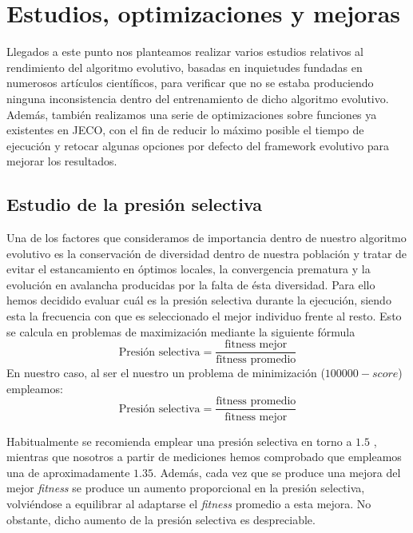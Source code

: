 \chapter{Estudios, optimizaciones y mejoras} \label{cap:analisis}
Llegados a este punto nos planteamos realizar varios estudios relativos al rendimiento del algoritmo evolutivo, basadas en inquietudes fundadas en numerosos artículos científicos, para verificar que no se estaba produciendo ninguna inconsistencia dentro del entrenamiento de dicho algoritmo evolutivo. Además, también realizamos una serie de optimizaciones sobre funciones ya existentes en JECO, con el fin de reducir lo máximo posible el tiempo de ejecución y retocar algunas opciones por defecto del framework evolutivo para mejorar los resultados.

\section{Estudio de la presión selectiva}
Una de los factores que consideramos de importancia dentro de nuestro algoritmo evolutivo es la conservación de diversidad dentro de nuestra población y tratar de evitar el estancamiento en óptimos locales, la convergencia prematura y la evolución en avalancha producidas por la falta de ésta diversidad. Para ello hemos decidido evaluar cuál es la presión selectiva durante la ejecución, siendo esta la frecuencia con que es seleccionado el mejor individuo frente al resto. Esto se calcula en problemas de maximización mediante la siguiente fórmula
\begin{equation*}
\textrm{Presión selectiva} = \frac{\textrm{fitness mejor}}{\textrm{fitness promedio}}
\end{equation*}
En nuestro caso, al ser el nuestro un problema de minimización ($100000 - score$) empleamos:
\begin{equation*}
\textrm{Presión selectiva} = \frac{\textrm{fitness promedio}}{\textrm{fitness mejor}}
\end{equation*}

Habitualmente se recomienda emplear una presión selectiva en torno a $1.5$ \cite{whitley1989genitor}, mientras que nosotros a partir de mediciones hemos comprobado que empleamos una de aproximadamente $1.35$. Además, cada vez que se produce una mejora del mejor \textit{fitness}  se produce un aumento proporcional en la presión selectiva, volviéndose a equilibrar al adaptarse el \textit{fitness} promedio a esta mejora. No obstante, dicho aumento de la presión selectiva es despreciable.
 
